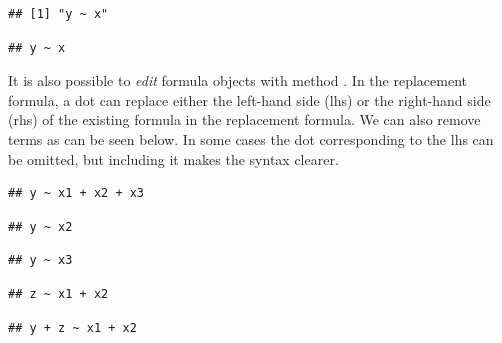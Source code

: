 \documentclass[krantz2]{krantz}\usepackage{knitr}
\begin{document}
\begin{explainbox}
\begin{knitrout}\footnotesize
{}\color{fgcolor}\begin{kframe}
\begin{alltt}
 \hlkwb{<-}  \hlopt{~} 
\end{alltt}
\begin{verbatim}
## [1] "y ~ x"
\end{verbatim}
\begin{alltt}
\end{alltt}
\begin{verbatim}
## y ~ x
\end{verbatim}
\end{kframe}
\end{knitrout}

It is also possible to \emph{edit} formula objects with method . In the replacement formula, a dot can replace either the left-hand side (lhs) or the right-hand side (rhs) of the existing formula in the replacement formula. We can also remove terms as can be seen below. In some cases the dot corresponding to the lhs can be omitted, but including it makes the syntax clearer.

\begin{knitrout}\footnotesize
{}\color{fgcolor}\begin{kframe}
\begin{alltt}
 \hlkwb{<-}  \hlopt{~}  \hlopt{+} 
 \hlopt{~}  \hlopt{+} 
\end{alltt}
\begin{verbatim}
## y ~ x1 + x2 + x3
\end{verbatim}
\begin{alltt}
 \hlopt{~}  \hlopt{-} 
\end{alltt}
\begin{verbatim}
## y ~ x2
\end{verbatim}
\begin{alltt}
 \hlopt{~} 
\end{alltt}
\begin{verbatim}
## y ~ x3
\end{verbatim}
\begin{alltt}
 \hlopt{~} 
\end{alltt}
\begin{verbatim}
## z ~ x1 + x2
\end{verbatim}
\begin{alltt}
 \hlopt{+}  \hlopt{~} 
\end{alltt}
\begin{verbatim}
## y + z ~ x1 + x2
\end{verbatim}
\end{kframe}
\end{knitrout}


\end{explainbox}
\end{document}
